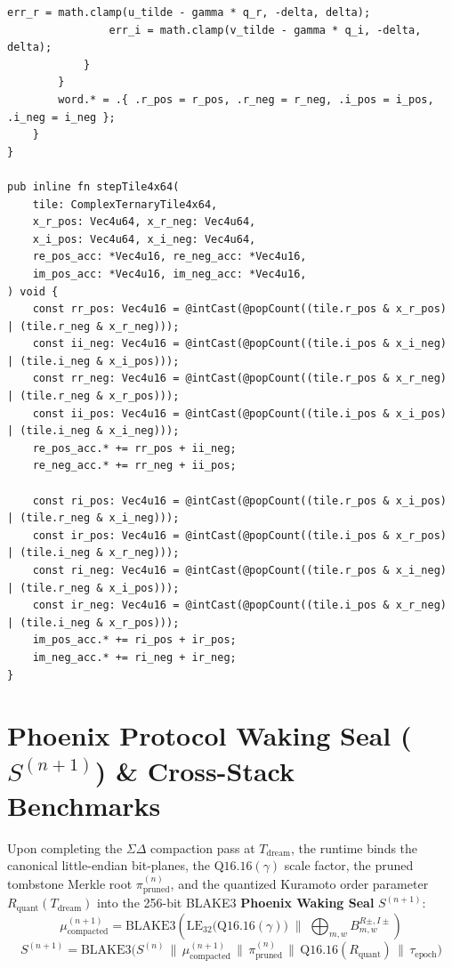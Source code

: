 \documentclass[10pt, twocolumn, a4paper]{article}
\begin{document}
\begin{lstlisting}[caption={Zero-Allocation Zig $\Sigma\Delta$ Bit-Plane Packer and 4-Row SIMD Contraction Kernel.}]
                err_r = math.clamp(u_tilde - gamma * q_r, -delta, delta);
                err_i = math.clamp(v_tilde - gamma * q_i, -delta, delta);
            }
        }
        word.* = .{ .r_pos = r_pos, .r_neg = r_neg, .i_pos = i_pos, .i_neg = i_neg };
    }
}

pub inline fn stepTile4x64(
    tile: ComplexTernaryTile4x64,
    x_r_pos: Vec4u64, x_r_neg: Vec4u64,
    x_i_pos: Vec4u64, x_i_neg: Vec4u64,
    re_pos_acc: *Vec4u16, re_neg_acc: *Vec4u16,
    im_pos_acc: *Vec4u16, im_neg_acc: *Vec4u16,
) void {
    const rr_pos: Vec4u16 = @intCast(@popCount((tile.r_pos & x_r_pos) | (tile.r_neg & x_r_neg)));
    const ii_neg: Vec4u16 = @intCast(@popCount((tile.i_pos & x_i_neg) | (tile.i_neg & x_i_pos)));
    const rr_neg: Vec4u16 = @intCast(@popCount((tile.r_pos & x_r_neg) | (tile.r_neg & x_r_pos)));
    const ii_pos: Vec4u16 = @intCast(@popCount((tile.i_pos & x_i_pos) | (tile.i_neg & x_i_neg)));
    re_pos_acc.* += rr_pos + ii_neg;
    re_neg_acc.* += rr_neg + ii_pos;

    const ri_pos: Vec4u16 = @intCast(@popCount((tile.r_pos & x_i_pos) | (tile.r_neg & x_i_neg)));
    const ir_pos: Vec4u16 = @intCast(@popCount((tile.i_pos & x_r_pos) | (tile.i_neg & x_r_neg)));
    const ri_neg: Vec4u16 = @intCast(@popCount((tile.r_pos & x_i_neg) | (tile.r_neg & x_i_pos)));
    const ir_neg: Vec4u16 = @intCast(@popCount((tile.i_pos & x_r_neg) | (tile.i_neg & x_r_pos)));
    im_pos_acc.* += ri_pos + ir_pos;
    im_neg_acc.* += ri_neg + ir_neg;
}
\end{lstlisting}

\section{Phoenix Protocol Waking Seal ($S^{(n+1)}$) \& Cross-Stack Benchmarks}

Upon completing the $\Sigma\Delta$ compaction pass at $T_{\text{dream}}$, the runtime binds the canonical little-endian bit-planes, the $\text{Q16.16}(\gamma)$ scale factor, the pruned tombstone Merkle root $\pi_{\text{pruned}}^{(n)}$, and the quantized Kuramoto order parameter $R_{\text{quant}}(T_{\text{dream}})$ into the 256-bit BLAKE3 \textbf{Phoenix Waking Seal} $S^{(n+1)}$:
\begin{equation}
\mu_{\text{compacted}}^{(n+1)} = \text{BLAKE3}\left( \text{LE}_{32}\big(\text{Q16.16}(\gamma)\big) \;\Big\|\; \bigoplus_{m,w} B_{m,w}^{R\pm, I\pm} \right)
\end{equation}
\begin{equation}
S^{(n+1)} = \text{BLAKE3}\Big( S^{(n)} \,\|\, \mu_{\text{compacted}}^{(n+1)} \,\|\, \pi_{\text{pruned}}^{(n)} \,\|\, \text{Q16.16}(R_{\text{quant}}) \,\|\, \tau_{\text{epoch}} \Big)
\end{equation}
\end{document}
